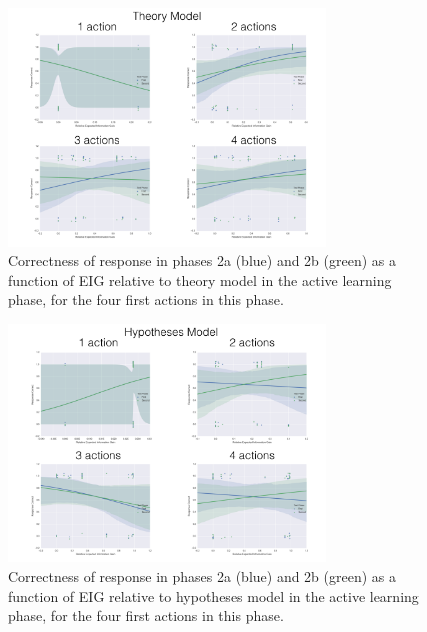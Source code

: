 \documentclass[11pt, a4paper]{article}
\begin{document}
\begin{figure}[h!]
\begin{center}
\includegraphics[width=0.75\textwidth]{../Plots/LogRegPlots/LogRegPlots_theory.png}
\end{center}
\caption{Correctness of response in phases 2a (blue) and 2b (green) as a function of EIG relative to theory model in the active learning phase, for the four first actions in this phase.}
\label{fig:logreg_theory}
\end{figure}

\begin{figure}[h!]
\begin{center}
\includegraphics[width=0.75\textwidth]{../Plots/LogRegPlots/LogRegPlots_hypotheses.png}
\end{center}
\caption{Correctness of response in phases 2a (blue) and 2b (green) as a function of EIG relative to hypotheses model in the active learning phase, for the four first actions in this phase.}
\label{fig:logreg_hypotheses}
\end{figure}
\end{document}
